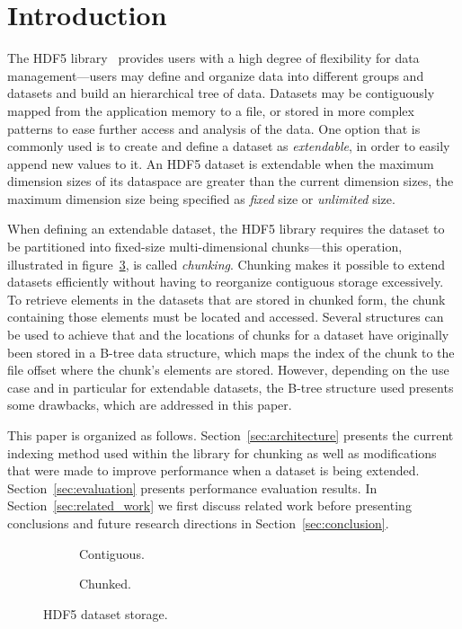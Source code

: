 
\section{Introduction}

The HDF5 library~\cite{Folk2011}\cite{Folk1999} provides users with a high degree of flexibility for data
management---users may define and organize data into different groups and
datasets and build an hierarchical tree of data. Datasets may be contiguously 
mapped from the application memory to a file, or stored in more complex 
patterns to ease further access and analysis of the data. One option that
is commonly used is to create and define a dataset as \textit{extendable},
in order to easily append new values to it.
An HDF5 dataset is extendable when the maximum dimension sizes of its 
dataspace are greater than the current dimension sizes, the maximum dimension 
size being specified as \textit{fixed} size or \textit{unlimited} size.

When defining an extendable dataset, the HDF5 library requires the dataset
to be partitioned into fixed-size multi-dimensional chunks---this operation, 
illustrated in figure~\ref{fig:hdf5_dataset}, is called \textit{chunking}.
Chunking makes it possible to extend datasets efficiently without having to
reorganize contiguous storage excessively. To retrieve elements in the
datasets that are stored in chunked form, the chunk containing those
elements must be located and accessed. Several structures can be used
to achieve that and the locations of chunks for a dataset have originally 
been stored in a B-tree data structure, which maps the index of the chunk to 
the file offset where the chunk's elements are stored. However, depending
on the use case and in particular for extendable datasets, the B-tree
structure used presents some drawbacks, which are addressed in this paper.

This paper is organized as follows. 
Section~\ref{sec:architecture} presents the 
current indexing method used within the library for chunking as well as 
modifications that were made to improve performance when a dataset is 
being extended. Section~\ref{sec:evaluation} presents performance evaluation 
results.
In Section~\ref{sec:related_work} we
first discuss related work before presenting conclusions and 
future research directions in Section~\ref{sec:conclusion}.

\begin{figure}
\begin{subfigure}[b]{.49\linewidth}
\centering

\caption{Contiguous.}
\label{fig:contiguous}
\end{subfigure}%
\hfill
\begin{subfigure}[b]{.49\linewidth}
\centering

\vspace{-15pt}
\caption{Chunked.}
\label{fig:chunked}
\end{subfigure}
\caption{HDF5 dataset storage.}
\label{fig:hdf5_dataset}
\end{figure}

